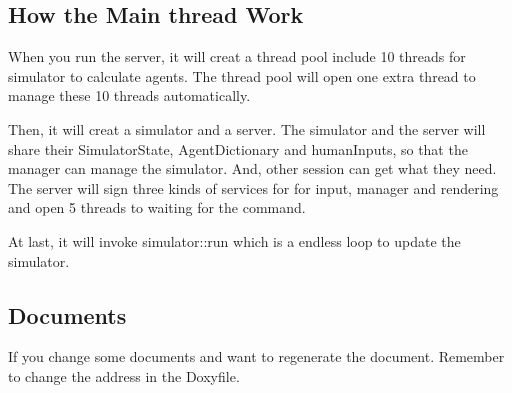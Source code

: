 \subsection*{How the Main thread Work}

When you run the server, it will creat a thread pool include 10 threads for simulator to calculate agents. The thread pool will open one extra thread to manage these 10 threads automatically.

Then, it will creat a simulator and a server. The simulator and the server will share their Simulator\+State, Agent\+Dictionary and human\+Inputs, so that the manager can manage the simulator. And, other session can get what they need. The server will sign three kinds of services for for input, manager and rendering and open 5 threads to waiting for the command.

At last, it will invoke simulator\+::run which is a endless loop to update the simulator.

\subsection*{Documents}

If you change some documents and want to regenerate the document. Remember to change the address in the Doxyfile. 